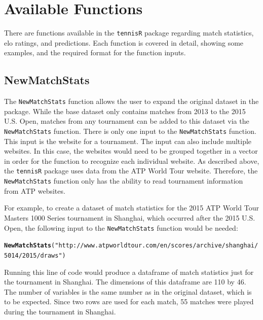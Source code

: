 \documentclass{article}\usepackage[]{graphicx}\usepackage[]{color}
\makeatletter
\newcommand{\hlstr}[1]{\textcolor[rgb]{0.192,0.494,0.8}{#1}}%
\newcommand{\hlstd}[1]{\textcolor[rgb]{0.345,0.345,0.345}{#1}}%
\newcommand{\hlkwd}[1]{\textcolor[rgb]{0.737,0.353,0.396}{\textbf{#1}}}%
\newenvironment{kframe}{%
 \def\at@end@of@kframe{}%
 \ifinner\ifhmode%
  \def\at@end@of@kframe{\end{minipage}}%
  \begin{minipage}{\columnwidth}%
 \fi\fi%
 \def\FrameCommand##1{\hskip\@totalleftmargin \hskip-\fboxsep
 \colorbox{shadecolor}{##1}\hskip-\fboxsep
     \hskip-\linewidth \hskip-\@totalleftmargin \hskip\columnwidth}%
 \MakeFramed {\advance\hsize-\width
   \@totalleftmargin\z@ \linewidth\hsize
   \@setminipage}}%
 {\par\unskip\endMakeFramed%
 \at@end@of@kframe}
\newenvironment{knitrout}{}{} %
\numberwithin{equation}{section} %
\newcommand{\pkg}[1]{{\texttt{#1}}}
\makeatother
\begin{document}
\section{Available Functions}

There are functions available in the \pkg{tennisR} package regarding match statistics, elo ratings, and predictions.  Each function is covered in detail, showing some examples, and the required format for the function inputs.

\subsection{NewMatchStats}

The \texttt{NewMatchStats} function allows the user to expand the original dataset in the package.  While the base dataset only contains matches from 2013 to the 2015 U.S. Open, matches from any tournament can be added to this dataset via the \texttt{NewMatchStats} function.  There is only one input to the \texttt{NewMatchStats} function.  This input is the website for a tournament.  The input can also include multiple websites.  In this case, the websites would need to be grouped together in a vector in order for the function to recognize each individual website.  As described above, the \pkg{tennisR} package uses data from the ATP World Tour website.  Therefore, the \texttt{NewMatchStats} function only has the ability to read tournament information from ATP websites.  

For example, to create a dataset of match statistics for the 2015 ATP World Tour Masters 1000 Series tournament in Shanghai, which occurred after the 2015 U.S. Open, the following input to the \texttt{NewMatchStats} function would be needed:

\begin{knitrout}
\color{fgcolor}\begin{kframe}
\begin{alltt}
\hlkwd{NewMatchStats}\hlstd{(}\hlstr{"http://www.atpworldtour.com/en/scores/archive/shanghai/5014/2015/draws"}\hlstd{)}
\end{alltt}
\end{kframe}
\end{knitrout}

Running this line of code would produce a dataframe of match statistics just for the tournament in Shanghai.  The dimensions of this dataframe are 110 by 46.  The number of variables is the same number as in the original dataset, which is to be expected.  Since two rows are used for each match, 55 matches were played during the tournament in Shanghai.
\end{document}
